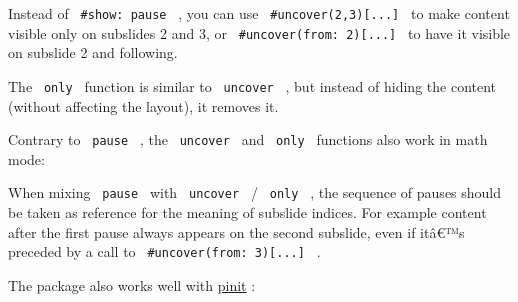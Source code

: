 Instead of \texttt{\ \#show:\ pause\ } , you can use
\texttt{\ \#uncover(2,3){[}...{]}\ } to make content visible only on
subslides 2 and 3, or \texttt{\ \#uncover(from:\ 2){[}...{]}\ } to have
it visible on subslide 2 and following.

The \texttt{\ only\ } function is similar to \texttt{\ uncover\ } , but
instead of hiding the content (without affecting the layout), it removes
it.

\begin{Shaded}
\begin{Highlighting}[]
\NormalTok{\#slide[}
  
\NormalTok{  \#uncover(1, from:3)[}
\NormalTok{  ]}

\NormalTok{  \#only(2,3)[}
\NormalTok{  ]}

\NormalTok{]}
\end{Highlighting}
\end{Shaded}

Contrary to \texttt{\ pause\ } , the \texttt{\ uncover\ } and
\texttt{\ only\ } functions also work in math mode:

\begin{Shaded}
\begin{Highlighting}[]
\NormalTok{\#slide[}

\NormalTok{  $}
\NormalTok{  $}
\NormalTok{]}
\end{Highlighting}
\end{Shaded}

When mixing \texttt{\ pause\ } with \texttt{\ uncover\ } /
\texttt{\ only\ } , the sequence of pauses should be taken as reference
for the meaning of subslide indices. For example content after the first
pause always appears on the second subslide, even if itâ€™s preceded by
a call to \texttt{\ \#uncover(from:\ 3){[}...{]}\ } .

The package also works well with
\href{https://typst.app/universe/package/pinit}{pinit} :

